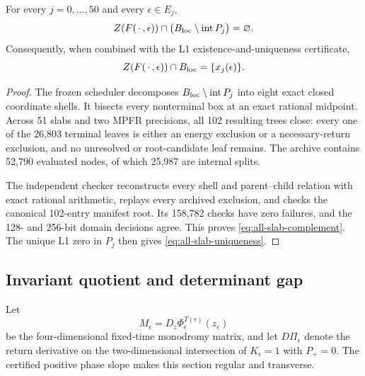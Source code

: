 \begin{theorem}
\label{thm:all-slab-complement}
For every \(j=0,\ldots,50\) and every \(\epsilon\in E_j\),
\begin{equation}
 Z(F(\,\cdot\,,\epsilon))\cap
 \bigl(B_{\rm loc}\setminus\operatorname{int}P_j\bigr)=\varnothing.
 \label{eq:all-slab-complement}
\end{equation}
Consequently, when combined with the L1 existence-and-uniqueness certificate,
\begin{equation}
 Z(F(\,\cdot\,,\epsilon))\cap B_{\rm loc}
 =\{x_j(\epsilon)\}.
 \label{eq:all-slab-uniqueness}
\end{equation}
\end{theorem}

\begin{proof}
The frozen scheduler decomposes
\(B_{\rm loc}\setminus\operatorname{int}P_j\) into eight exact closed
coordinate shells.  It bisects every nonterminal box at an exact rational
midpoint.  Across 51 slabs and two MPFR precisions, all 102 resulting trees
close: every one of the 26,803 terminal leaves is either an energy exclusion
or a necessary-return exclusion, and no unresolved or root-candidate leaf
remains.  The archive contains 52,790 evaluated nodes, of which 25,987 are
internal splits.

The independent checker reconstructs every shell and parent--child relation
with exact rational arithmetic, replays every archived exclusion, and checks
the canonical 102-entry manifest root.  Its 158,782 checks have zero
failures, and the 128- and 256-bit domain decisions agree.  This proves
\cref{eq:all-slab-complement}.  The unique L1 zero in \(P_j\) then gives
\cref{eq:all-slab-uniqueness}.
\end{proof}

\subsection{Invariant quotient and determinant gap}

Let
\begin{equation}
 M_\epsilon=D_z\Phi_\epsilon^{T(\epsilon)}(z_\epsilon)
 \label{eq:monodromy}
\end{equation}
be the four-dimensional fixed-time monodromy matrix, and let
\(D\Pi_\epsilon\) denote the return derivative on the two-dimensional
intersection of \(K_\epsilon=1\) with \(P_+=0\).  The certified positive
phase slope makes this section regular and transverse.

